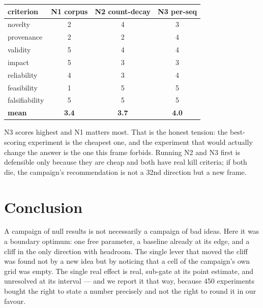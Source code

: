 \documentclass{article}
\begin{document}
\begin{center}\begin{small}
\begin{tabular}{lccc}
\toprule
criterion & N1 corpus & N2 count-decay & N3 per-seq \\
\midrule
novelty        & 2 & 4 & 3 \\
provenance     & 2 & 2 & 4 \\
validity       & 5 & 4 & 4 \\
impact         & 5 & 3 & 3 \\
reliability    & 4 & 3 & 4 \\
feasibility    & 1 & 5 & 5 \\
falsifiability & 5 & 5 & 5 \\
\midrule
\textbf{mean}  & \textbf{3.4} & \textbf{3.7} & \textbf{4.0} \\
\bottomrule
\end{tabular}
\end{small}\end{center}

N3 scores highest and N1 matters most. That is the honest tension: the best-scoring experiment is the cheapest one, and the experiment that would actually change the answer is the one this frame forbids. Running N2 and N3 first is defensible only because they are cheap and both have real kill criteria; if both die, the campaign's recommendation is not a 32nd direction but a new frame.

\section{Conclusion}
A campaign of null results is not necessarily a campaign of bad ideas. Here it was a boundary optimum: one free parameter, a baseline already at its edge, and a cliff in the only direction with headroom. The single lever that moved the cliff was found not by a new idea but by noticing that a cell of the campaign's own grid was empty. The single real effect is real, sub-gate at its point estimate, and unresolved at its interval --- and we report it that way, because 450 experiments bought the right to state a number precisely and not the right to round it in our favour.
\end{document}
